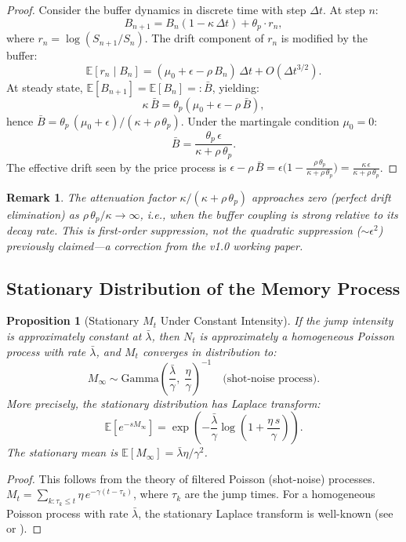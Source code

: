 \documentclass[11pt,a4paper]{article}
\newtheorem{proposition}[theorem]{Proposition}
\newtheorem{remark}[theorem]{Remark}
\newcommand{\E}{\mathbb{E}}
\begin{document}
\begin{proof}
Consider the buffer dynamics in discrete time with step $\Delta t$.
At step $n$:
\[
  B_{n+1} = B_n(1 - \kappa\,\Delta t) + \theta_p \cdot r_n,
\]
where $r_n = \log(S_{n+1}/S_n)$. The drift component of $r_n$ is modified
by the buffer:
\[
  \E[r_n \mid B_n] = (\mu_0 + \epsilon - \rho\, B_n)\,\Delta t + O(\Delta t^{3/2}).
\]
At steady state, $\E[B_{n+1}] = \E[B_n] =: \bar{B}$, yielding:
\[
  \kappa\,\bar{B} = \theta_p(\mu_0 + \epsilon - \rho\,\bar{B}),
\]
hence $\bar{B} = \theta_p\,(\mu_0 + \epsilon) / (\kappa + \rho\,\theta_p)$.
Under the martingale condition $\mu_0 = 0$:
\[
  \bar{B} = \frac{\theta_p\,\epsilon}{\kappa + \rho\,\theta_p}.
\]
The effective drift seen by the price process is $\epsilon - \rho\,\bar{B}
= \epsilon\bigl(1 - \frac{\rho\,\theta_p}{\kappa + \rho\,\theta_p}\bigr)
= \frac{\kappa\,\epsilon}{\kappa + \rho\,\theta_p}$.
\end{proof}

\begin{remark}
The attenuation factor $\kappa/(\kappa + \rho\,\theta_p)$ approaches zero
(perfect drift elimination) as $\rho\,\theta_p / \kappa \to \infty$, i.e.,
when the buffer coupling is strong relative to its decay rate. This is
first-order suppression, not the quadratic suppression ($\sim\epsilon^2$)
previously claimed---a correction from the v1.0 working paper.
\end{remark}

\subsection{Stationary Distribution of the Memory Process}

\begin{proposition}[Stationary $M_t$ Under Constant Intensity]
\label{prop:stat_M}
If the jump intensity is approximately constant at $\bar{\lambda}$,
then $N_t$ is approximately a homogeneous Poisson process with rate
$\bar{\lambda}$, and $M_t$ converges in distribution to:
\[
  M_\infty \sim \text{Gamma}\!\left(\frac{\bar{\lambda}}{\gamma},\; \frac{\eta}{\gamma}\right)^{-1}
  \quad\text{(shot-noise process)}.
\]
More precisely, the stationary distribution has Laplace transform:
\[
  \E[e^{-s M_\infty}] = \exp\!\left(-\frac{\bar{\lambda}}{\gamma}
  \log\!\left(1 + \frac{\eta\, s}{\gamma}\right)\right).
\]
The stationary mean is $\E[M_\infty] = \bar{\lambda}\eta / \gamma^2$.
\end{proposition}

\begin{proof}
This follows from the theory of filtered Poisson (shot-noise) processes.
$M_t = \sum_{k:\tau_k \leq t} \eta\, e^{-\gamma(t-\tau_k)}$, where
$\tau_k$ are the jump times. For a homogeneous Poisson process with rate
$\bar{\lambda}$, the stationary Laplace transform is well-known
(see \citet{rice1944} or \citet{daley2003}).
\end{proof}
\end{document}
